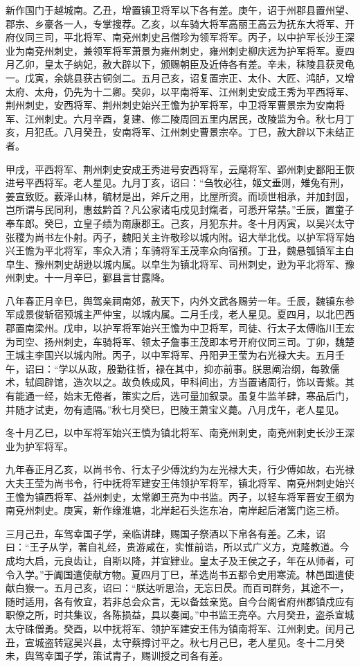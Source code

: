 \documentclass[12pt,UTF8]{ctexbook}
\begin{document}
新作国门于越城南。乙丑，增置镇卫将军以下各有差。庚午，诏于州郡县置州望、郡宗、乡豪各一人，专掌搜荐。乙亥，以车骑大将军高丽王高云为抚东大将军、开府仪同三司，平北将军、南兗州刺史吕僧珍为领军将军。丙子，以中护军长沙王深业为南兗州刺史，兼领军将军萧景为雍州刺史，雍州刺史柳庆远为护军将军。夏四月乙卯，皇太子纳妃，赦大辟以下，颁赐朝臣及近侍各有差。辛未，秣陵县获灵龟一。戊寅，余姚县获古铜剑二。五月己亥，诏复置宗正、太仆、大匠、鸿胪，又增太府、太舟，仍先为十二卿。癸卯，以平南将军、江州刺史安成王秀为平西将军、荆州刺史，安西将军、荆州刺史始兴王憺为护军将军，中卫将军曹景宗为安南将军、江州刺史。六月辛酉，复建、修二陵周回五里内居民，改陵监为令。秋七月丁亥，月犯氐。八月癸丑，安南将军、江州刺史曹景宗卒。丁巳，赦大辟以下未结正者。

甲戌，平西将军、荆州刺史安成王秀进号安西将军，云麾将军、郢州刺史鄱阳王恢进号平西将军。老人星见。九月丁亥，诏曰：“刍牧必往，姬文垂则，雉兔有刑，姜宣致贬。薮泽山林，毓材是出，斧斤之用，比屋所资。而顷世相承，并加封固，岂所谓与民同利，惠兹黔首？凡公家诸屯戍见封熂者，可悉开常禁。”壬辰，置童子奉车郎。癸巳，立皇子绩为南康郡王。己亥，月犯东井。冬十月丙寅，以吴兴太守张稷为尚书左仆射。丙子，魏阳关主许敬珍以城内附。诏大举北伐。以护军将军始兴王憺为平北将军，率众入清；车骑将军王茂率众向宿预。丁丑，魏悬瓠镇军主白皁生、豫州刺史胡逊以城内属。以皁生为镇北将军、司州刺史，逊为平北将军、豫州刺史。十一月辛巳，鄞县言甘露降。

八年春正月辛巳，舆驾亲祠南郊，赦天下，内外文武各赐劳一年。壬辰，魏镇东参军成景俊斩宿预城主严仲宝，以城内属。二月壬戌，老人星见。夏四月，以北巴西郡置南梁州。戊申，以护军将军始兴王憺为中卫将军，司徒、行太子太傅临川王宏为司空、扬州刺史，车骑将军、领太子詹事王茂即本号开府仪同三司。丁卯，魏楚王城主李国兴以城内附。丙子，以中军将军、丹阳尹王莹为右光禄大夫。五月壬午，诏曰：“学以从政，殷勤往哲，禄在其中，抑亦前事。朕思阐治纲，每敦儒术，轼闾辟馆，造次以之。故负帙成风，甲科间出，方当置诸周行，饰以青紫。其有能通一经，始末无倦者，策实之后，选可量加叙录。虽复牛监羊肆，寒品后门，并随才试吏，勿有遗隔。”秋七月癸巳，巴陵王萧宝义薨。八月戊午，老人星见。

冬十月乙巳，以中军将军始兴王慎为镇北将军、南兗州刺史，南兗州刺史长沙王深业为护军将军。

九年春正月乙亥，以尚书令、行太子少傅沈约为左光禄大夫，行少傅如故，右光禄大夫王莹为尚书令，行中抚将军建安王伟领护军将军，镇北将军、南兗州刺史始兴王憺为镇西将军、益州刺史，太常卿王亮为中书监。丙子，以轻车将军晋安王纲为南兗州刺史。庚寅，新作缘淮塘，北岸起石头迄东冶，南岸起后渚篱门迄三桥。

三月己丑，车驾幸国子学，亲临讲肆，赐国子祭酒以下帛各有差。乙未，诏曰：“王子从学，著自礼经，贵游咸在，实惟前诰，所以式广义方，克隆教道。今成均大启，元良齿让，自斯以降，并宜肄业。皇太子及王侯之子，年在从师者，可令入学。”于阗国遣使献方物。夏四月丁巳，革选尚书五都令史用寒流。林邑国遣使献白猴一。五月己亥，诏曰：“朕达听思治，无忘日昃。而百司群务，其途不一，随时适用，各有攸宜，若非总会众言，无以备兹亲览。自今台阁省府州郡镇戍应有职僚之所，时共集议，各陈损益，具以奏闻。”中书监王亮卒。六月癸丑，盗杀宣城太守硃僧勇。癸酉，以中抚将军、领护军建安王伟为镇南将军、江州刺史。闰月己丑，宣城盗转寇吴兴县，太守蔡撙讨平之。秋七月己巳，老人星见。冬十二月癸未，舆驾幸国子学，策试胄子，赐训授之司各有差。
\end{document}
